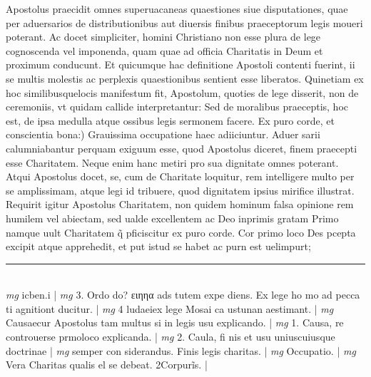 \documentclass{article}
\begin{document}
\begin{pages}
Apostolus praecidit omnes superuacaneas quaestiones siue disputationes, quae per aduersarios de distributionibus aut diuersis finibus praeceptorum legis moueri poterant. Ac docet simpliciter, homini Christiano non esse plura de lege cognoscenda vel imponenda, quam quae ad officia Charitatis in Deum et proximum conducunt. Et quicumque  hac definitione Apostoli contenti fuerint, ii se multis molestis ac perplexis quaestionibus sentient esse liberatos. Quinetiam ex hoc similibusquelocis manifestum fit, Apostolum, quoties de lege disserit, non de ceremoniis, vt quidam callide interpretantur: Sed de moralibus praeceptis, hoc est, de ipsa medulla atque ossibus legis sermonem facere.  \pend\pstart Ex puro corde, et conscientia bona:) Grauissima occupatione haec adiiciuntur. Aduer sarii calumniabantur perquam exiguum esse, quod Apostolus diceret, finem praecepti esse Charitatem. Neque  enim hanc metiri pro sua dignitate omnes poterant. Atqui Apostolus docet, se, cum de Charitate loquitur, rem intelligere multo per se amplissimam, atque  legi id tribuere, quod dignitatem ipsius mirifice illustrat. Requirit igitur Apostolus Charitatem, non quidem hominum falsa opinione rem humilem vel abiectam, sed ualde excellentem ac Deo inprimis gratam Primo namque  uult Charitatem q̃ pficiscitur ex puro corde. Cor primo loco Des pcepta excipit atque  apprehedit, et put istud se habet ac purn est uelimpurt;  \pend
\vspace{0.5cm}\noindent
\vspace{0.2cm}\rule{1cm}{0.2pt}\\ 
\hspace{0.2cm}\textit{mg}
\footnotesize icben.i 
\normalsize| 
\hspace{0.2cm}\textit{mg}
\footnotesize 3. Ordo do? ειηηα ads tutem expe diens. Ex lege ho mo ad pecca ti agnitiont ducitur. 
\normalsize| 
\hspace{0.2cm}\textit{mg}
\footnotesize 4 ludaeiex lege Mosai ca ustunan aestimant. 
\normalsize| 
\hspace{0.2cm}\textit{mg}
\footnotesize Causaecur Apostolus tam multus si in legis usu explicando. 
\normalsize| 
\hspace{0.2cm}\textit{mg}
\footnotesize 1. Causa, re controuerse prmoloco explicanda. 
\normalsize| 
\hspace{0.2cm}\textit{mg}
\footnotesize 2. Caula, fi nis et usu uniuscuiusque  doctrinae 
\normalsize| 
\hspace{0.2cm}\textit{mg}
\footnotesize semper con siderandus. Finis legis charitas. 
\normalsize| 
\hspace{0.2cm}\textit{mg}
\footnotesize Occupatio. 
\normalsize| 
\hspace{0.2cm}\textit{mg}
\footnotesize Vera Charitas qualis el se debeat. 2Corpurĩs. 
\normalsize| 

\end{pages}
\end{document}
